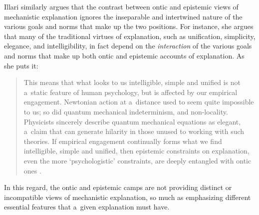 Illari
\parencite*[][]{illari_mechanistic_2013} %
 similarly argues that the contrast between ontic and epistemic views of mechanistic explanation ignores the inseparable and intertwined nature of the various goals and norms that make up the two positions. For instance, she argues that many of the traditional virtues of explanation, such as unification, simplicity, elegance, and intelligibility, in fact depend on the \textit{interaction} of the various goals and norms that make up both ontic and epistemic accounts of explanation. As she puts it:

\begin{quotation}
This means that what looks to us intelligible, simple and unified is not a~static feature of human psychology, but is affected by our empirical engagement. Newtonian action at a~distance used to seem quite impossible to us; so did quantum mechanical indeterminism, and non-locality. Physicists sincerely describe quantum mechanical equations as elegant, a~claim that can generate hilarity in those unused to working with such theories. If empirical engagement continually forms what we find intelligible, simple and unified, then epistemic constraints on explanation, even the more ‘psychologistic' constraints, are deeply entangled with ontic ones
\parencite*[][p.254]{mackonis_inference_2013}.%


\end{quotation}
In this regard, the ontic and epistemic camps are not providing distinct or incompatible views of mechanistic explanation, so much as emphasizing different essential features that a~given explanation must have.


